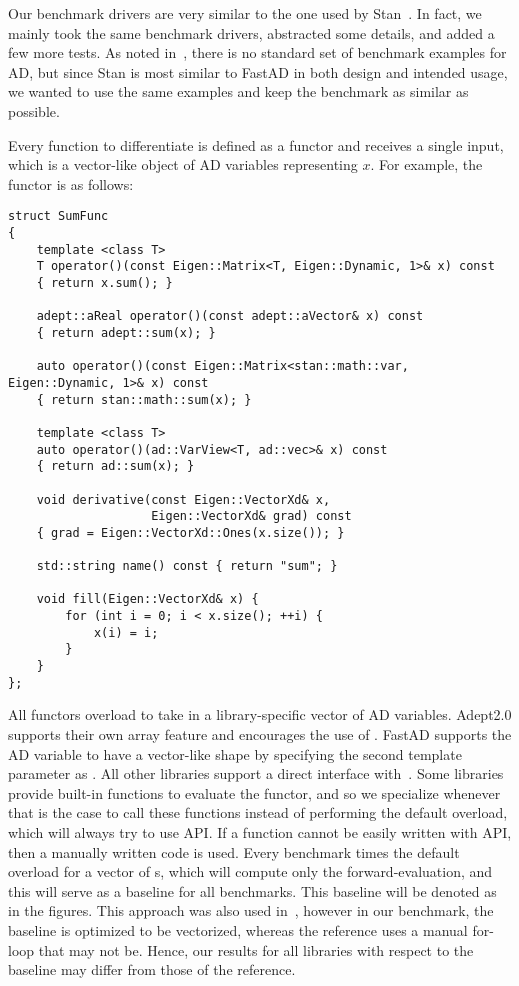 Our benchmark drivers are very similar to the one used by Stan~\cite{carpenter:2015}.
In fact, we mainly took the same benchmark drivers, abstracted some details, and added a few more tests.
As noted in~\cite{margossian:2018}, there is no standard set of benchmark examples for AD,
but since Stan is most similar to FastAD in both design and intended usage,
we wanted to use the same examples and keep the benchmark as similar as possible.

Every function to differentiate is defined as a functor and receives a single input,
which is a vector-like object of AD variables representing $x$.
For example, the  functor is as follows:
\begin{lstlisting}[style=customcpp]
struct SumFunc
{
    template <class T>
    T operator()(const Eigen::Matrix<T, Eigen::Dynamic, 1>& x) const
    { return x.sum(); }

    adept::aReal operator()(const adept::aVector& x) const
    { return adept::sum(x); }

    auto operator()(const Eigen::Matrix<stan::math::var, Eigen::Dynamic, 1>& x) const
    { return stan::math::sum(x); }

    template <class T>
    auto operator()(ad::VarView<T, ad::vec>& x) const
    { return ad::sum(x); }

    void derivative(const Eigen::VectorXd& x,
                    Eigen::VectorXd& grad) const
    { grad = Eigen::VectorXd::Ones(x.size()); }

    std::string name() const { return "sum"; }

    void fill(Eigen::VectorXd& x) {
        for (int i = 0; i < x.size(); ++i) {
            x(i) = i;
        }
    }
};
\end{lstlisting}
\fi
All functors overload  to take in a library-specific vector of AD variables.
Adept2.0 supports their own array feature and encourages the use of .
FastAD supports the AD variable to have a vector-like shape by specifying the second template parameter as .
All other libraries support a direct interface with~.
Some libraries provide built-in functions to evaluate the functor, and so we specialize whenever that is the case
to call these functions instead of performing the default overload,
which will always try to use  API.
If a function cannot be easily written with  API, then a manually written code is used.
Every benchmark times the default overload for a vector of s,
which will compute only the forward-evaluation, and this will serve as a baseline for all benchmarks.
This baseline will be denoted as  in the figures.
This approach was also used in~\cite{carpenter:2015},
however in our benchmark, the baseline is optimized to be vectorized,
whereas the reference uses a manual for-loop that may not be.
Hence, our results for all libraries with respect to the baseline may differ from those of the reference.


